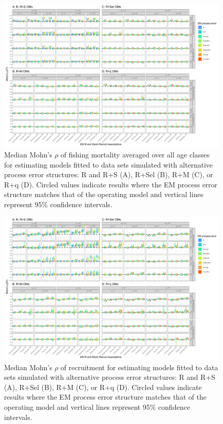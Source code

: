 \documentclass[
  12pt,
]{article}
\begin{document}
\begin{landscape}
\begin{figure}
\begin{center}
\includegraphics{mohns_rho_F_plots}
\end{center}
\caption{Median Mohn's $\rho$ of fishing mortality averaged over all age classes for estimating models fitted to data sets simulated with alternative process error structures: R and R+S (A), R+Sel (B), R+M (C), or R+q (D). Circled values indicate results where the EM process error structure matches that of the operating model and vertical lines represent 95\% confidence intervals.}\label{mohns_rho_F}
\end{figure}
\end{landscape}

\begin{landscape}
\begin{figure}
\begin{center}
\includegraphics{mohns_rho_R_plots}
\end{center}
\caption{Median Mohn's $\rho$ of recruitment for estimating models fitted to data sets simulated with alternative process error structures: R and R+S (A), R+Sel (B), R+M (C), or R+q (D). Circled values indicate results where the EM process error structure matches that of the operating model and vertical lines represent 95\% confidence intervals.}\label{mohns_rho_R}
\end{figure}
\end{landscape}
\end{document}
